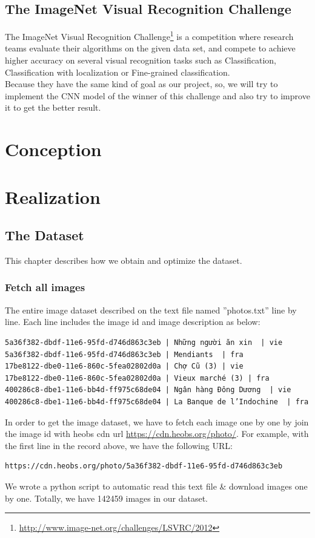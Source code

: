 \documentclass[hidelinks,12pt,a4paper]{report}
\begin{document}
\section{The ImageNet Visual Recognition Challenge}

The ImageNet Visual Recognition Challenge\footnote{\url{http://www.image-net.org/challenges/LSVRC/2012}} is a competition where research teams evaluate their algorithms on the given data set, and compete to achieve higher accuracy on several visual recognition tasks such as Classification, Classification with localization or Fine-grained classification. \\
Because they have the same kind of goal as our project, so, we will try to implement the CNN model of the winner of this challenge and also try to improve it to get the better result.

\chapter{Conception}

\chapter{Realization}
\section{The Dataset}
This chapter describes how we obtain and optimize the dataset.
\subsection{Fetch all images}
The entire image dataset described on the text file named ”photos.txt” line by line. Each line includes the image id and image description as below:
\begin{verbatim}
5a36f382-dbdf-11e6-95fd-d746d863c3eb | Những người ăn xin  | vie
5a36f382-dbdf-11e6-95fd-d746d863c3eb | Mendiants  | fra
17be8122-dbe0-11e6-860c-5fea02802d0a | Chợ Cũ (3) | vie
17be8122-dbe0-11e6-860c-5fea02802d0a | Vieux marché (3) | fra
400286c8-dbe1-11e6-bb4d-ff975c68de04 | Ngân hàng Đông Dương  | vie
400286c8-dbe1-11e6-bb4d-ff975c68de04 | La Banque de l’Indochine  | fra
\end{verbatim}
In order to get the image dataset, we have to fetch each image one by one by join the image id with heobs cdn url \href{https://cdn.heobs.org/photo/}{https://cdn.heobs.org/photo/}. For example, with the first line in the record above, we have the following URL: 
\begin{verbatim}
https://cdn.heobs.org/photo/5a36f382-dbdf-11e6-95fd-d746d863c3eb
\end{verbatim}
We wrote a python script to automatic read this text file \& download images one by one.
Totally, we have 142459 images in our dataset.
\end{document}
